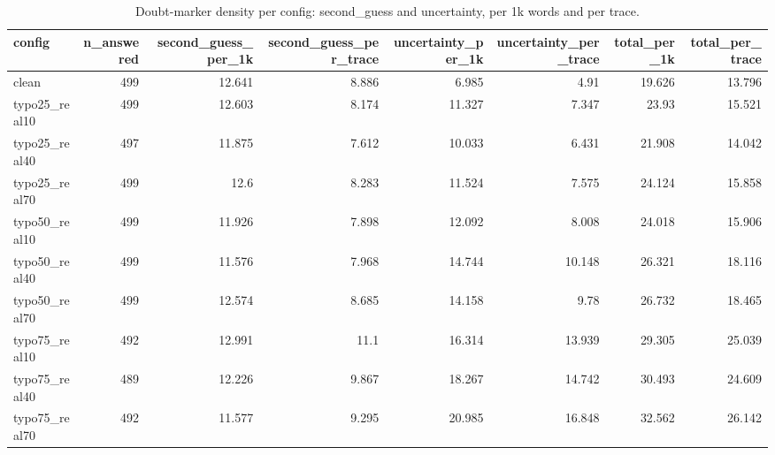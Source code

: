 \documentclass[11pt]{article}
\begin{document}
\begin{table}[H]
\centering
\caption{Doubt-marker density per config: second\_guess and uncertainty, per 1k words and per trace.}
\small
\begin{adjustbox}{max width=\textwidth}
\begin{tabular}{lrrrrrrr}
\toprule
\textbf{config} & \textbf{n\_answered} & \textbf{second\_guess\_per\_1k} & \textbf{second\_guess\_per\_trace} & \textbf{uncertainty\_per\_1k} & \textbf{uncertainty\_per\_trace} & \textbf{total\_per\_1k} & \textbf{total\_per\_trace} \\
\midrule
clean & 499 & 12.641 & 8.886 & 6.985 & 4.91 & 19.626 & 13.796 \\
typo25\_real10 & 499 & 12.603 & 8.174 & 11.327 & 7.347 & 23.93 & 15.521 \\
typo25\_real40 & 497 & 11.875 & 7.612 & 10.033 & 6.431 & 21.908 & 14.042 \\
typo25\_real70 & 499 & 12.6 & 8.283 & 11.524 & 7.575 & 24.124 & 15.858 \\
typo50\_real10 & 499 & 11.926 & 7.898 & 12.092 & 8.008 & 24.018 & 15.906 \\
typo50\_real40 & 499 & 11.576 & 7.968 & 14.744 & 10.148 & 26.321 & 18.116 \\
typo50\_real70 & 499 & 12.574 & 8.685 & 14.158 & 9.78 & 26.732 & 18.465 \\
typo75\_real10 & 492 & 12.991 & 11.1 & 16.314 & 13.939 & 29.305 & 25.039 \\
typo75\_real40 & 489 & 12.226 & 9.867 & 18.267 & 14.742 & 30.493 & 24.609 \\
typo75\_real70 & 492 & 11.577 & 9.295 & 20.985 & 16.848 & 32.562 & 26.142 \\
\bottomrule
\end{tabular}
\end{adjustbox}
\end{table}
\end{document}
